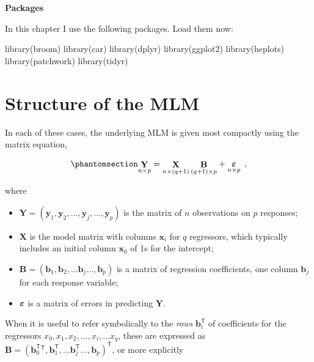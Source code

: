 \documentclass[
  letterpaper,
  10pt,
  krantz2]{krantz}
\makeatletter
\newenvironment{Shaded}{\begin{snugshade}}{\end{snugshade}}
\newcommand{\FunctionTok}[1]{\textcolor[rgb]{0.28,0.35,0.67}{#1}}
\newcommand{\NormalTok}[1]{\textcolor[rgb]{0.00,0.23,0.31}{#1}}
\providecommand{\tightlist}{%
  \setlength{\itemsep}{0pt}\setlength{\parskip}{0pt}}\usepackage{longtable,booktabs,array}
\newenvironment{kframe}{%
  \medskip{}
  \setlength{\fboxsep}{.8em}
  \def\at@end@of@kframe{}%
  \ifinner\ifhmode%
  \def\at@end@of@kframe{\end{minipage}}%
  \begin{minipage}{\columnwidth}%
  \fi\fi%
  \def\FrameCommand##1{\hskip\@totalleftmargin \hskip-\fboxsep
  \colorbox{shadecolor}{##1}\hskip-\fboxsep
      \hskip-\linewidth \hskip-\@totalleftmargin \hskip\columnwidth}%
  \MakeFramed {\advance\hsize-\width
    \@totalleftmargin\z@ \linewidth\hsize
    \@setminipage}}%
{\par\unskip\endMakeFramed%
  \at@end@of@kframe}
\renewenvironment{Shaded}{\begin{kframe}}{\end{kframe}}
\makeatother
\begin{document}
\textbf{Packages}

In this chapter I use the following packages. Load them now:

\begin{Shaded}
\begin{Highlighting}[]
\FunctionTok{library}\NormalTok{(broom)}
\FunctionTok{library}\NormalTok{(car)}
\FunctionTok{library}\NormalTok{(dplyr)}
\FunctionTok{library}\NormalTok{(ggplot2)}
\FunctionTok{library}\NormalTok{(heplots)}
\FunctionTok{library}\NormalTok{(patchwork)}
\FunctionTok{library}\NormalTok{(tidyr)}
\end{Highlighting}
\end{Shaded}

\section{Structure of the MLM}\label{structure-of-the-mlm}

In each of these cases, the underlying MLM is given most compactly using
the matrix equation,

\begin{equation}\phantomsection\label{eq-mlm}{
\mathord{\mathop{\mathbf{Y}}\limits_{n \times p}} = 
\mathord{\mathop{\mathbf{X}}\limits_{n \times (q+1)}} \, \mathord{\mathop{\mathbf{B}}\limits_{(q+1) \times p}} + \mathord{\mathop{\mathbf{\boldsymbol{\Large\varepsilon}}}\limits_{n \times p}} \:\: ,
}\end{equation}

where

\begin{itemize}
\tightlist
\item
  \(\mathbf{Y} = (\mathbf{y}_1 , \mathbf{y}_2, \dots , \mathbf{y}_j, \dots, \mathbf{y}_p )\)
  is the matrix of \(n\) observations on \(p\) responses;
\item
  \(\mathbf{X}\) is the model matrix with columns \(\mathbf{x}_i\) for
  \(q\) regressors, which typically includes an initial column
  \(\mathbf{x}_0\) of 1s for the intercept;
\item
  \(\mathbf{B} = ( \mathbf{b}_1 , \mathbf{b}_2 , \dots \mathbf{b}_j \dots, \mathbf{b}_p )\)
  is a matrix of regression coefficients, one column \(\mathbf{b}_j\)
  for each response variable;
\item
  \(\boldsymbol{\Large\varepsilon}\) is a matrix of errors in predicting
  \(\mathbf{Y}\).
\end{itemize}

When it is useful to refer symbolically to the \emph{rows}
\(\mathbf{b}_i^\mathsf{T}\) of coefficients for the regressors
\(x_0, x_1, x_2, \dots, x_i, \dots x_q\), these are expressed as
\(\mathbf{B} = ( \mathbf{b}_0^\mathsf{T}^\mathsf{T} , \mathbf{b}_1^\mathsf{T} , \dots \mathbf{b}_j^\mathsf{T} \dots, \mathbf{b}_p )^\mathsf{T}\),
or more explicitly
\end{document}
